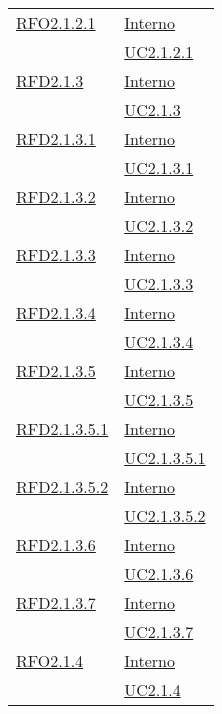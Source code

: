 \begin{longtable}{|>{\centering}m{5cm}|m{5cm}<{\centering}|}
\hyperlink{RFO2.1.2.1}{RFO2.1.2.1} & \hyperlink{Interno}{Interno}\\
& \hyperref[UC2.1.2.1]{UC2.1.2.1}\\ \hline

\hyperlink{RFD2.1.3}{RFD2.1.3} & \hyperlink{Interno}{Interno}\\
& \hyperref[UC2.1.3]{UC2.1.3}\\ \hline

\hyperlink{RFD2.1.3.1}{RFD2.1.3.1} & \hyperlink{Interno}{Interno}\\
& \hyperref[UC2.1.3.1]{UC2.1.3.1}\\ \hline

\hyperlink{RFD2.1.3.2}{RFD2.1.3.2} & \hyperlink{Interno}{Interno}\\
& \hyperref[UC2.1.3.2]{UC2.1.3.2}\\ \hline

\hyperlink{RFD2.1.3.3}{RFD2.1.3.3} & \hyperlink{Interno}{Interno}\\
& \hyperref[UC2.1.3.3]{UC2.1.3.3}\\ \hline

\hyperlink{RFD2.1.3.4}{RFD2.1.3.4} & \hyperlink{Interno}{Interno}\\
& \hyperref[UC2.1.3.4]{UC2.1.3.4}\\ \hline

\hyperlink{RFD2.1.3.5}{RFD2.1.3.5} & \hyperlink{Interno}{Interno}\\
& \hyperref[UC2.1.3.5]{UC2.1.3.5}\\ \hline

\hyperlink{RFD2.1.3.5.1}{RFD2.1.3.5.1} & \hyperlink{Interno}{Interno}\\
& \hyperref[UC2.1.3.5.1]{UC2.1.3.5.1}\\ \hline

\hyperlink{RFD2.1.3.5.2}{RFD2.1.3.5.2} & \hyperlink{Interno}{Interno}\\
& \hyperref[UC2.1.3.5.2]{UC2.1.3.5.2}\\ \hline

\hyperlink{RFD2.1.3.6}{RFD2.1.3.6} & \hyperlink{Interno}{Interno}\\
& \hyperref[UC2.1.3.6]{UC2.1.3.6}\\ \hline

\hyperlink{RFD2.1.3.7}{RFD2.1.3.7} & \hyperlink{Interno}{Interno}\\
& \hyperref[UC2.1.3.7]{UC2.1.3.7}\\ \hline

\hyperlink{RFO2.1.4}{RFO2.1.4} & \hyperlink{Interno}{Interno}\\
& \hyperref[UC2.1.4]{UC2.1.4}\\ \hline


\end{longtable}
